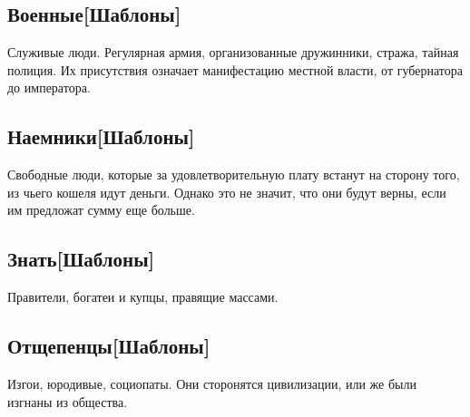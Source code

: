 \subsection{Военные[Шаблоны]}
Служивые люди. Регулярная армия, организованные дружинники, стража, тайная полиция. Их присутствия означает манифестацию местной власти, от губернатора до императора.

\subsection{Наемники[Шаблоны]}
Свободные люди, которые за удовлетворительную плату встанут на сторону того, из чьего кошеля идут деньги. Однако это не значит, что они будут верны, если им предложат сумму еще больше.

\subsection{Знать[Шаблоны]}
Правители, богатеи и купцы, правящие массами.

\subsection{Отщепенцы[Шаблоны]}
Изгои, юродивые, социопаты. Они сторонятся цивилизации, или же были изгнаны из общества.

\printindex[monsters]